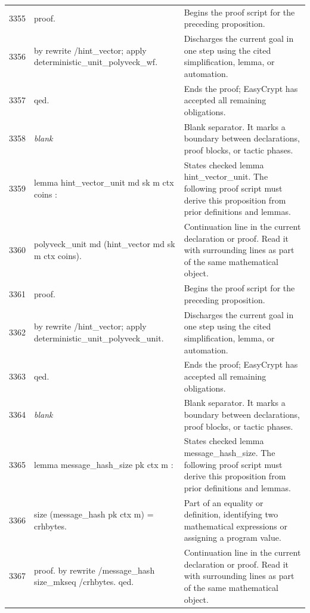 \documentclass[10pt]{article}
\begin{document}
\begin{longtable}{r L{0.53\textwidth} L{0.37\textwidth}}
3355 & {\ttfamily\scriptsize proof.} & Begins the proof script for the preceding proposition. \\
3356 & {\ttfamily\scriptsize by rewrite /hint\_vector; apply deterministic\_unit\_polyveck\_wf.} & Discharges the current goal in one step using the cited simplification, lemma, or automation. \\
3357 & {\ttfamily\scriptsize qed.} & Ends the proof; EasyCrypt has accepted all remaining obligations. \\
3358 & {\ttfamily\scriptsize \emph{blank}} & Blank separator.  It marks a boundary between declarations, proof blocks, or tactic phases. \\
3359 & {\ttfamily\scriptsize lemma hint\_vector\_unit md sk m ctx coins :} & States checked lemma hint\_vector\_unit.  The following proof script must derive this proposition from prior definitions and lemmas. \\
3360 & {\ttfamily\scriptsize   polyveck\_unit md (hint\_vector md sk m ctx coins).} & Continuation line in the current declaration or proof.  Read it with surrounding lines as part of the same mathematical object. \\
3361 & {\ttfamily\scriptsize proof.} & Begins the proof script for the preceding proposition. \\
3362 & {\ttfamily\scriptsize by rewrite /hint\_vector; apply deterministic\_unit\_polyveck\_unit.} & Discharges the current goal in one step using the cited simplification, lemma, or automation. \\
3363 & {\ttfamily\scriptsize qed.} & Ends the proof; EasyCrypt has accepted all remaining obligations. \\
3364 & {\ttfamily\scriptsize \emph{blank}} & Blank separator.  It marks a boundary between declarations, proof blocks, or tactic phases. \\
3365 & {\ttfamily\scriptsize lemma message\_hash\_size pk ctx m :} & States checked lemma message\_hash\_size.  The following proof script must derive this proposition from prior definitions and lemmas. \\
3366 & {\ttfamily\scriptsize   size (message\_hash pk ctx m) = crhbytes.} & Part of an equality or definition, identifying two mathematical expressions or assigning a program value. \\
3367 & {\ttfamily\scriptsize proof. by rewrite /message\_hash size\_mkseq /crhbytes. qed.} & Continuation line in the current declaration or proof.  Read it with surrounding lines as part of the same mathematical object. \\

\end{longtable}
\end{document}
